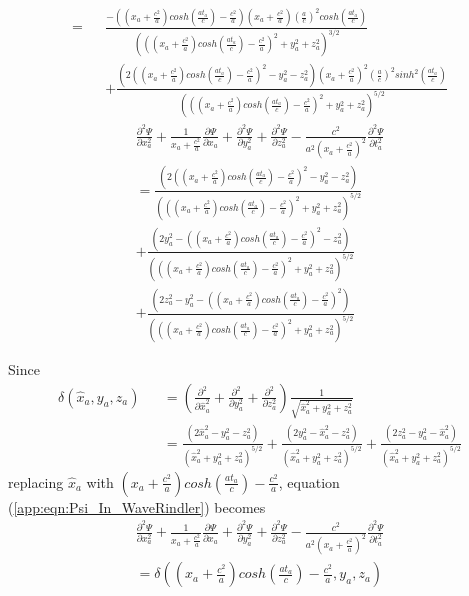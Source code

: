 \documentclass[prd,showpacs,preprint]{revtex4}
\begin{document}
\begin{appendix}
\begin{eqnarray}
=&&\frac{-((x_a+\frac{c^2}{a})cosh(\frac{at_a}{c})-\frac{c^2}{a})(x_a+\frac{c^2}{a})(\frac{a}{c})^2cosh(\frac{at_a}{c})}{(((x_a+\frac{c^2}{a})cosh(\frac{at_a}{c})-\frac{c^2}{a})^2+y_a^2+z_a^2)^{3/2}}\nonumber\\
&&+\frac{(2((x_a+\frac{c^2}{a})cosh(\frac{at_a}{c})-\frac{c^2}{a})^2-y_a^2-z_a^2)(x_a+\frac{c^2}{a})^2(\frac{a}{c})^2sinh^2(\frac{at_a}{c})}{(((x_a+\frac{c^2}{a})cosh(\frac{at_a}{c})-\frac{c^2}{a})^2+y_a^2+z_a^2)^{5/2}}
\end{eqnarray}
\begin{eqnarray}
\frac{\partial^2 \Psi}{\partial x_a^2} + \frac{1}{x_a+\frac{c^2}{a}}\frac{\partial \Psi}{\partial x_a} + \frac{\partial^2 \Psi}{\partial y_a^2} + \frac{\partial^2 \Psi}{\partial z_a^2} - \frac{c^2}{a^2(x_a+\frac{c^2}{a})^2}\frac{\partial^2 \Psi}{\partial t_a^2}\nonumber\\
=\frac{(2((x_a+\frac{c^2}{a})cosh(\frac{at_a}{c})-\frac{c^2}{a})^2-y_a^2-z_a^2)}{(((x_a+\frac{c^2}{a})cosh(\frac{at_a}{c})-\frac{c^2}{a})^2+y_a^2+z_a^2)^{5/2}}\nonumber\\
+\frac{(2y_a^2-((x_a+\frac{c^2}{a})cosh(\frac{at_a}{c})-\frac{c^2}{a})^2-z_a^2)}{(((x_a+\frac{c^2}{a})cosh(\frac{at_a}{c})-\frac{c^2}{a})^2+y_a^2+z_a^2)^{5/2}}\nonumber\\
+\frac{(2z_a^2-y_a^2-((x_a+\frac{c^2}{a})cosh(\frac{at_a}{c})-\frac{c^2}{a})^2)}{(((x_a+\frac{c^2}{a})cosh(\frac{at_a}{c})-\frac{c^2}{a})^2+y_a^2+z_a^2)^{5/2}}
\label{app:eqn:Psi_In_WaveRindler}
\end{eqnarray}

Since
\begin{eqnarray}
\delta(\hat{x}_a,y_a,z_a)&&=(\frac{\partial^2}{\partial \hat{x}_a^2} + \frac{\partial^2}{\partial y_a^2} + \frac{\partial^2}{\partial z_a^2})\frac{1}{\sqrt{\hat{x}_a^2+y_a^2+z_a^2}}\nonumber\\
&&=\frac{(2\hat{x}_a^2-y_a^2-z_a^2)}{(\hat{x}_a^2+y_a^2+z_a^2)^{5/2}} + \frac{(2y_a^2-\hat{x}_a^2-z_a^2)}{(\hat{x}_a^2+y_a^2+z_a^2)^{5/2}}
+\frac{(2z_a^2-y_a^2-\hat{x}_a^2)}{(\hat{x}_a^2+y_a^2+z_a^2)^{5/2}}
\end{eqnarray}
replacing $\hat{x}_a$ with $(x_a+\frac{c^2}{a})cosh(\frac{at_a}{c})-\frac{c^2}{a}$, equation (\ref{app:eqn:Psi_In_WaveRindler}) becomes
\begin{eqnarray}
\frac{\partial^2 \Psi}{\partial x_a^2} + \frac{1}{x_a+\frac{c^2}{a}}\frac{\partial \Psi}{\partial x_a} + \frac{\partial^2 \Psi}{\partial y_a^2} + \frac{\partial^2 \Psi}{\partial z_a^2} - \frac{c^2}{a^2(x_a+\frac{c^2}{a})^2}\frac{\partial^2 \Psi}{\partial t_a^2}\nonumber\\
=\delta((x_a+\frac{c^2}{a})cosh(\frac{at_a}{c})-\frac{c^2}{a},y_a,z_a)
\label{app:eqn:WaveRindler_Free_Fall}
\end{eqnarray}


\end{appendix}
\end{document}

